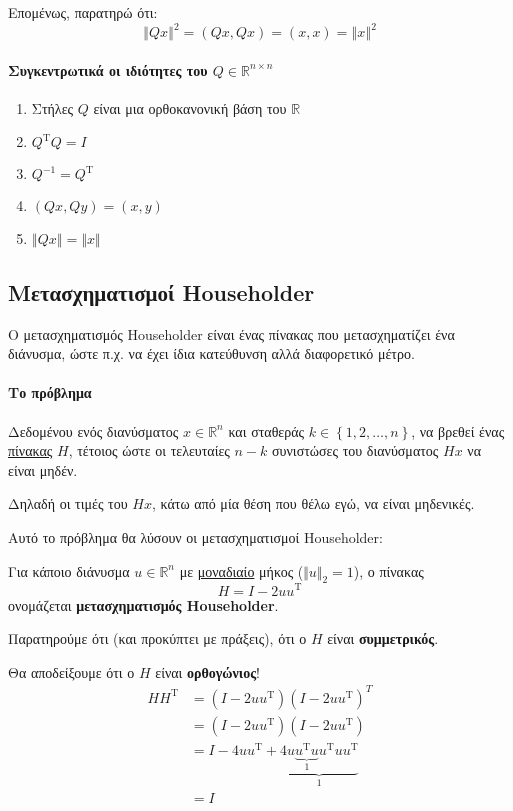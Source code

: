 \documentclass[11pt,a4paper,notitlepage,fleqn,final]{article}
\begin{document}
Επομένως, παρατηρώ ότι:
\[
\left\Vert Qx \right\Vert^2
= (Qx,Qx) = (x,x) = \left\Vert x \right\Vert^2
\]

\paragraph{Συγκεντρωτικά οι ιδιότητες του \( Q \in \mathbb
	 R^{n\times n} \)}
\begin{enumerate}
	\item Στήλες \( Q \) είναι μια ορθοκανονική βάση του
	\( \mathbb R  \)
	\item \( Q^{\mathrm T} Q = I \)
	\item \( Q^{-1} = Q^{\mathrm T} \)
	\item \( (Qx,Qy) = (x,y) \)
	\item \( \left\Vert Qx \right\Vert = \Vert x\Vert \)
\end{enumerate}

\subsection{Μετασχηματισμοί Householder}
Ο μετασχηματισμός Householder είναι ένας πίνακας που μετασχηματίζει
ένα διάνυσμα, ώστε π.χ. να έχει ίδια κατεύθυνση αλλά διαφορετικό
μέτρο.

\paragraph{Το πρόβλημα}
Δεδομένου ενός διανύσματος \( x \in \mathbb R^n \) και σταθεράς
\( k \in \left\lbrace 1,2,\dots,n \right\rbrace \), να βρεθεί ένας
\underline{πίνακας} \( H \), τέτοιος ώστε οι τελευταίες \( n-k \)
συνιστώσες του διανύσματος \( Hx \) να είναι μηδέν.

Δηλαδή οι τιμές του \( Hx \), κάτω από μία θέση που θέλω εγώ, να
είναι μηδενικές.

Αυτό το πρόβλημα θα λύσουν οι μετασχηματισμοί Householder:
\begin{defn}{}{}
Για κάποιο διάνυσμα \( u \in \mathbb R^n \) με
\underline{μοναδιαίο} μήκος (\( \Vert u\Vert_2 = 1 \)), ο πίνακας
\[
\boxed{H = I - 2uu^{\mathrm T}}
\]
ονομάζεται \textbf{μετασχηματισμός Householder}.
\end{defn}

Παρατηρούμε ότι (και προκύπτει με πράξεις), ότι ο \( H \) είναι
\textbf{συμμετρικός}.

Θα αποδείξουμε ότι ο \( H \) είναι \textbf{ορθογώνιος}!
\begin{align*}
	HH^{\mathrm T} &=
	(I-2uu^{\mathrm T})(I-2uu^{\mathrm T})^T \\
	&= (I-2uu^{\mathrm T})(I-2uu^{\mathrm T}) \\
	&= I-4uu^{\mathrm T} +
	\underbrace{4u\underbrace{u^{\mathrm T} u}_1
	u^{\mathrm T}uu^{\mathrm T}}_1 \\
	&= I
\end{align*}
\end{document}
